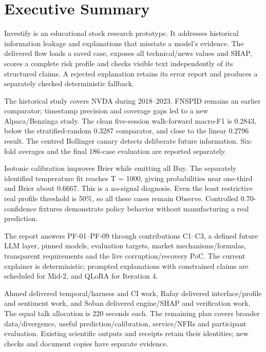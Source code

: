 \chapter*{Executive Summary}
Investify is an educational stock research prototype. It addresses historical information leakage and explanations that misstate a model's evidence. The delivered flow loads a saved case, exposes all technical/news values and SHAP, scores a complete risk profile and checks visible text independently of its structured claims. A rejected explanation retains its error report and produces a separately checked deterministic fallback.

The historical study covers NVDA during 2018--2023. FNSPID remains an earlier comparator; timestamp precision and coverage gaps led to a new Alpaca/Benzinga study. The clean five-session walk-forward macro-F1 is 0.2843, below the stratified-random 0.3287 comparator, and close to the linear 0.2796 result. The centred Bollinger canary detects deliberate future information. Six-fold averages and the final 186-case evaluation are reported separately.

Isotonic calibration improves Brier while emitting all Buy. The separately identified temperature fit reaches T = 1000, giving probabilities near one-third and Brier about 0.6667. This is a no-signal diagnosis. Even the least restrictive real profile threshold is 50\%, so all these cases remain Observe. Controlled 0.70-confidence fixtures demonstrate policy behavior without manufacturing a real prediction.

The report answers PF-01--PF-09 through contributions C1--C3, a defined future LLM layer, pinned models, evaluation targets, market mechanisms/formulas, transparent requirements and the live corruption/recovery PoC. The current explainer is deterministic; prompted explanations with constrained claims are scheduled for Mid-2, and QLoRA for Iteration 4.

Ahmed delivered temporal/harness and CI work, Rafay delivered interface/profile and sentiment work, and Soban delivered engine/SHAP and verification work. The equal talk allocation is 220 seconds each. The remaining plan covers broader data/divergence, useful prediction/calibration, service/NFRs and participant evaluation. Existing scientific outputs and receipts retain their identities; new checks and document copies have separate evidence.
